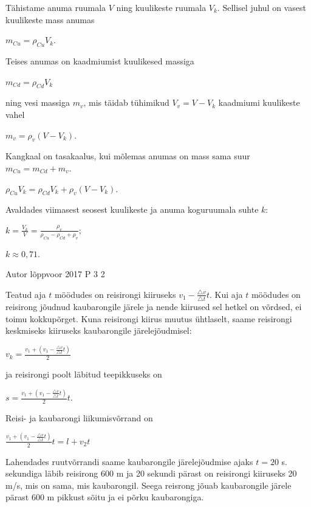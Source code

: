 \documentclass[11pt]{article}
\begin{document}
{{\ifSolution
Tähistame anuma ruumala $V$ ning kuulikeste ruumala $V_k$. Sellisel juhul on vasest kuulikeste mass anumas
\begin{center}
$m_{Cu} = \rho_{Cu}V_k$. 
\end{center}
Teises anumas on kaadmiumist kuulikesed massiga 
\begin{center}
$m_{Cd} = \rho_{Cd} V_k$ 
\end{center}
ning vesi massiga $m_v$, mis täidab tühimikud $V_v = V - V_k$ kaadmiumi kuulikeste vahel 
\begin{center}
$m_v = \rho_v(V - V_k)$.
\end{center}
Kangkaal on tasakaalus, kui mõlemas anumas on mass sama suur $m_{Cu} = m_{Cd} + m_v$.
\begin{center}
$\rho_{Cu}V_k = \rho_{Cd}V_k + \rho_v(V - V_k)$.
\end{center}
Avaldades viimasest seosest kuulikeste ja anuma koguruumala suhte $k$:
\begin{center}
$k = \frac{V_k}{V} = \frac{\rho_v}{\rho_{Cu} - \rho_{Cd} + \rho_v}$;
\end{center}
\begin{center}
$k \approx 0,71$. 
\end{center}
\fi
}

{Autor} %
{lõppvoor} %
{2017} %
{P 3} %
{2} %
{

\ifSolution
Teatud aja $t$ möödudes on reisirongi kiiruseks $v_1 - \frac{\triangle v}{\triangle t} t$. Kui aja $t$ möödudes on reisirong jõudnud kaubarongile järele ja nende kiirused sel hetkel on võrdsed, ei toimu kokkupõrget. Kuna reisirongi kiirus muutus ühtlaselt, saame reisirongi keskmiseks kiiruseks kaubarongile järelejõudmisel:
\begin{center}
$v_k = \frac{v_1 + (v_1 - \frac{\triangle v}{\triangle t}t)}{2}$
\end{center}
ja reisirongi poolt läbitud teepikkuseks on
\begin{center}
$s = \frac{v_1 + (v_1 - \frac{\triangle v}{\triangle t}t)}{2} t$.
\end{center}
Reisi- ja kaubarongi liikumisvõrrand on
\begin{center}
$\frac{v_1 + (v_1 - \frac{\triangle v}{\triangle t}t)}{2}t = l + v_2 t$
\end{center}
Lahendades ruutvõrrandi saame kaubarongile järelejõudmise ajaks $t = 20$ s.
 sekundiga läbib reisirong 600 m ja 20 sekundi pärast on reisirongi
kiiruseks 20 m/s, mis on sama, mis kaubarongil.
\newline
Seega reisrong jõuab kaubarongile järele pärast 600 m pikkust sõitu ja
ei põrku kaubarongiga.
\fi
}

}
\end{document}
